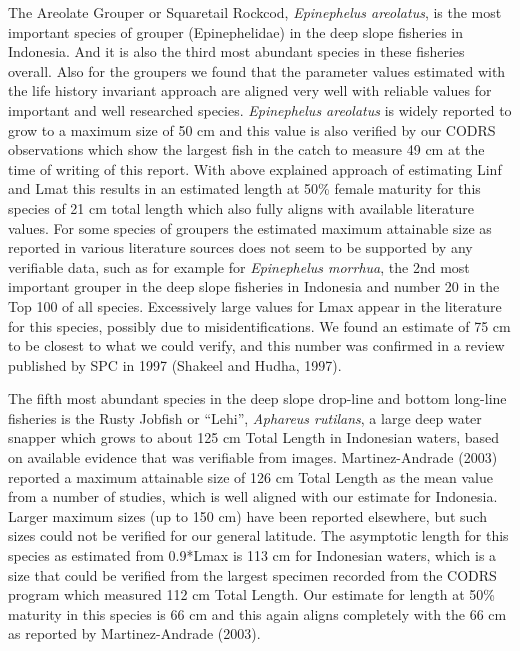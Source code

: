 The Areolate Grouper or Squaretail Rockcod, \textit{Epinephelus areolatus}, is the most important species of grouper (Epinephelidae) in the deep slope fisheries in Indonesia. And it is also the third most abundant species in these fisheries overall. Also for the groupers we found that the parameter values estimated with the life history invariant approach are aligned very well with reliable values for important and well researched species. \textit{Epinephelus areolatus} is widely reported to grow to a maximum size of 50 cm and this value is also verified by our CODRS observations which show the largest fish in the catch to measure 49 cm at the time of writing of this report. With above explained approach of estimating Linf and Lmat this results in an estimated length at 50\% female maturity for this species of 21 cm total length which also fully aligns with available literature values.
\clearpage
\newpage
For some species of groupers the estimated maximum attainable size as reported in various literature sources does not seem to be supported by any verifiable data, such as for example for \textit{Epinephelus morrhua}, the 2nd most important grouper in the deep slope fisheries in Indonesia and number 20 in the Top 100 of all species. Excessively large values for Lmax appear in the literature for this species, possibly due to misidentifications. We found an estimate of 75 cm to be closest to what we could verify, and this number was confirmed in a review published by SPC in 1997 (Shakeel and Hudha, 1997).

The fifth most abundant species in the deep slope drop-line and bottom long-line fisheries is the Rusty Jobfish or ``Lehi'', \textit{Aphareus rutilans}, a large deep water snapper which grows to about 125 cm Total Length in Indonesian waters, based on available evidence that was verifiable from images. Martinez-Andrade (2003) reported a maximum attainable size of 126 cm Total Length as the mean value from a number of studies, which is well aligned with our estimate for Indonesia.  Larger maximum sizes (up to 150 cm) have been reported elsewhere, but such sizes could not be verified for our general latitude. The asymptotic length for this species as estimated from 0.9*Lmax is 113 cm for Indonesian waters, which is a size that could be verified from the largest specimen recorded from the CODRS program which measured 112 cm Total Length. Our estimate for length at 50\% maturity in this species is 66 cm and this again aligns completely with the 66 cm as reported by Martinez-Andrade (2003).

